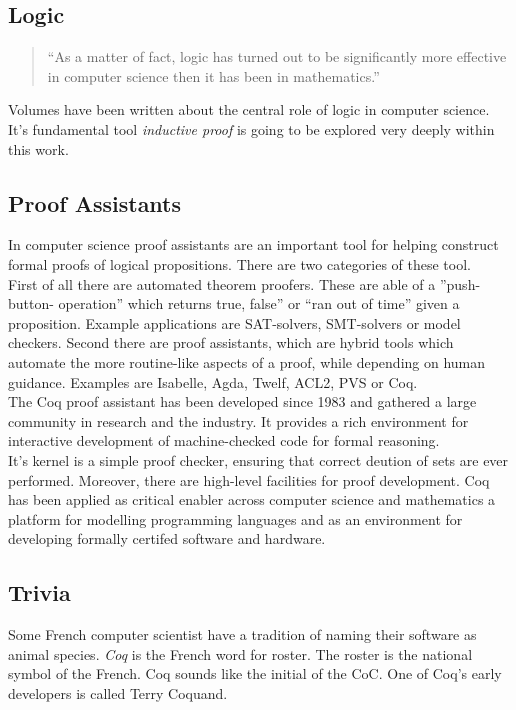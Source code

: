 \subsection{Logic}

\begin{quote}
``As a matter of fact, logic has turned out to be significantly more effective in computer science then it has been in mathematics.''
\end{quote}
Volumes have been written about the central role of logic in computer science. 
It's fundamental tool {\itshape inductive proof} is going to be explored very deeply within this work.

\subsection{Proof Assistants}
In computer science proof assistants are an important tool for helping construct formal proofs of logical propositions.
There are two categories of these tool.\\
First of all there are automated theorem proofers. 
These are able of a ''push-button- operation'' which returns true, false'' or ``ran out of time'' given a proposition.
Example applications are SAT-solvers, SMT-solvers or model checkers. 
Second there are proof assistants, which are hybrid tools which automate the more routine-like aspects of a proof, while depending on human guidance. 
Examples are \gls{Isabelle}, Agda, Twelf, ACL2, PVS or Coq.\\
The Coq proof assistant has been developed since 1983 and gathered a large community in research and the industry.
It provides a rich environment for interactive development of machine-checked code for formal reasoning.\\
It's kernel is a simple proof checker, ensuring that correct deution of sets are ever performed. 
Moreover, there are high-level facilities for proof development.
Coq has been applied as critical enabler across computer science and mathematics a platform for modelling programming languages and as an environment for developing formally certifed software and hardware.
 

\subsection{Trivia}
Some French computer scientist have a tradition of naming their software as animal species.
{\itshape Coq} is the French word for roster.
The roster is the national symbol of the French.
Coq sounds like the initial of the \gls{CoC}.
One of Coq's early developers is called Terry Coquand.

